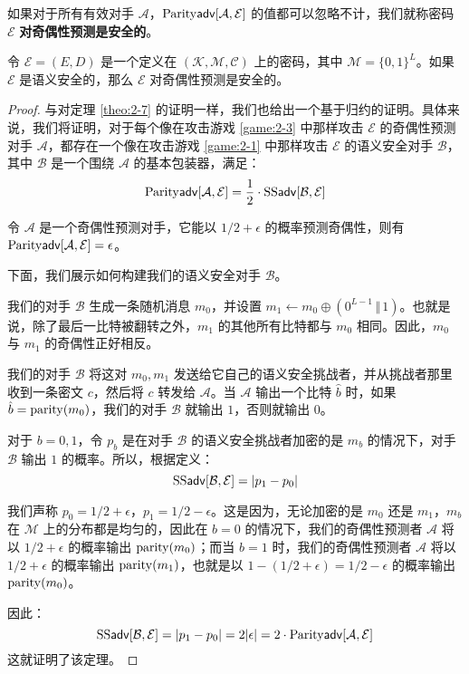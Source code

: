 \begin{definition}[奇偶性预测]\label{def:2-4}
如果对于所有有效对手 $\mathcal{A}$，${\rm Parity\mathsf{adv}}[\mathcal{A},\mathcal{E}]$ 的值都可以忽略不计，我们就称密码 $\mathcal{E}$ \textbf{对奇偶性预测是安全的}。
\end{definition}

\begin{theorem}\label{theo:2-8}
令 $\mathcal{E}=(E,D)$ 是一个定义在 $(\mathcal{K},\mathcal{M},\mathcal{C})$ 上的密码，其中 $\mathcal{M}=\{0,1\}^L$。如果 $\mathcal{E}$ 是语义安全的，那么 $\mathcal{E}$ 对奇偶性预测是安全的。
\end{theorem}

\begin{proof}
与对定理 \ref{theo:2-7} 的证明一样，我们也给出一个基于归约的证明。具体来说，我们将证明，对于每个像在攻击游戏 \ref{game:2-3} 中那样攻击 $\mathcal{E}$ 的奇偶性预测对手 $\mathcal{A}$，都存在一个像在攻击游戏 \ref{game:2-1} 中那样攻击 $\mathcal{E}$ 的语义安全对手 $\mathcal{B}$，其中 $\mathcal{B}$ 是一个围绕 $\mathcal{A}$ 的基本包装器，满足：
\[
{\rm Parity\mathsf{adv}}[\mathcal{A},\mathcal{E}]
=
\frac{1}{2}\cdot
{\rm SS\mathsf{adv}}[\mathcal{B},\mathcal{E}]
\]

令 $\mathcal{A}$ 是一个奇偶性预测对手，它能以 $1/2+\epsilon$ 的概率预测奇偶性，则有 ${\rm Parity\mathsf{adv}}[\mathcal{A},\mathcal{E}]=\epsilon$。

下面，我们展示如何构建我们的语义安全对手 $\mathcal{B}$。

我们的对手 $\mathcal{B}$ 生成一条随机消息 $m_0$，并设置 $m_1\leftarrow m_0\oplus(0^{L-1}\,\Vert\,1)$。也就是说，除了最后一比特被翻转之外，$m_1$ 的其他所有比特都与 $m_0$ 相同。因此，$m_0$ 与 $m_1$ 的奇偶性正好相反。

我们的对手 $\mathcal{B}$ 将这对 $m_0,m_1$ 发送给它自己的语义安全挑战者，并从挑战者那里收到一条密文 $c$，然后将 $c$ 转发给 $\mathcal{A}$。当 $\mathcal{A}$ 输出一个比特 $\hat b$ 时，如果 $\hat b={\rm parity}(m_0)$，我们的对手 $\mathcal{B}$ 就输出 $1$，否则就输出 $0$。

对于 $b=0,1$，令 $p_b$ 是在对手 $\mathcal{B}$ 的语义安全挑战者加密的是 $m_b$ 的情况下，对手 $\mathcal{B}$ 输出 $1$ 的概率。所以，根据定义：
\[
{\rm SS\mathsf{adv}}[\mathcal{B},\mathcal{E}]=|p_1-p_0|
\]

我们声称 $p_0={1}/{2}+\epsilon$，$p_1={1}/{2}-\epsilon$。这是因为，无论加密的是 $m_0$ 还是 $m_1$，$m_b$ 在 $\mathcal{M}$ 上的分布都是均匀的，因此在 $b=0$ 的情况下，我们的奇偶性预测者 $\mathcal{A}$ 将以 ${1}/{2}+\epsilon$ 的概率输出 ${\rm parity}(m_0)$；而当 $b=1$ 时，我们的奇偶性预测者 $\mathcal{A}$ 将以 ${1}/{2}+\epsilon$ 的概率输出 ${\rm parity}(m_1)$，也就是以 $1-({1}/{2}+\epsilon)={1}/{2}-\epsilon$ 的概率输出 ${\rm parity}(m_0)$。

因此：
\[
{\rm SS\mathsf{adv}}[\mathcal{B},\mathcal{E}]=|p_1-p_0|=2|\epsilon|=2\cdot{\rm Parity\mathsf{adv}}[\mathcal{A},\mathcal{E}]
\]
这就证明了该定理。
\end{proof}

